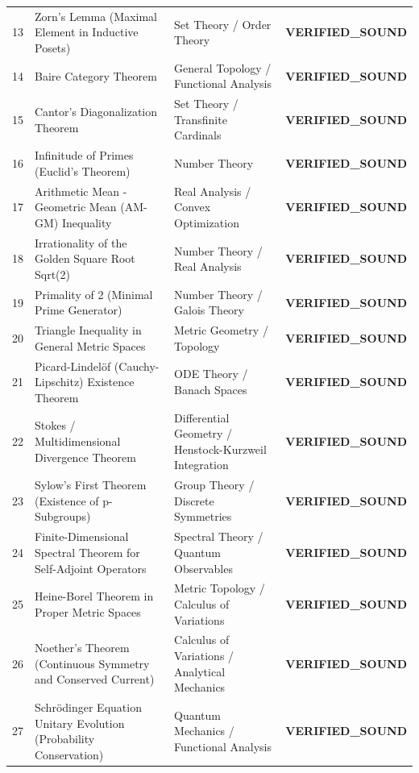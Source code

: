 \documentclass[10pt,a4paper]{article}
\begin{document}
\begin{longtable}{p{0.6cm} p{6.8cm} p{4.0cm} p{3.2cm}}
13 & Zorn's Lemma (Maximal Element in Inductive Posets) & Set Theory / Order Theory & \textcolor{green!70!black}{\textbf{VERIFIED\_SOUND}} \\
14 & Baire Category Theorem & General Topology / Functional Analysis & \textcolor{green!70!black}{\textbf{VERIFIED\_SOUND}} \\
15 & Cantor's Diagonalization Theorem & Set Theory / Transfinite Cardinals & \textcolor{green!70!black}{\textbf{VERIFIED\_SOUND}} \\
16 & Infinitude of Primes (Euclid's Theorem) & Number Theory & \textcolor{green!70!black}{\textbf{VERIFIED\_SOUND}} \\
17 & Arithmetic Mean - Geometric Mean (AM-GM) Inequality & Real Analysis / Convex Optimization & \textcolor{green!70!black}{\textbf{VERIFIED\_SOUND}} \\
18 & Irrationality of the Golden Square Root Sqrt(2) & Number Theory / Real Analysis & \textcolor{green!70!black}{\textbf{VERIFIED\_SOUND}} \\
19 & Primality of 2 (Minimal Prime Generator) & Number Theory / Galois Theory & \textcolor{green!70!black}{\textbf{VERIFIED\_SOUND}} \\
20 & Triangle Inequality in General Metric Spaces & Metric Geometry / Topology & \textcolor{green!70!black}{\textbf{VERIFIED\_SOUND}} \\
21 & Picard-Lindelöf (Cauchy-Lipschitz) Existence Theorem & ODE Theory / Banach Spaces & \textcolor{green!70!black}{\textbf{VERIFIED\_SOUND}} \\
22 & Stokes / Multidimensional Divergence Theorem & Differential Geometry / Henstock-Kurzweil Integration & \textcolor{green!70!black}{\textbf{VERIFIED\_SOUND}} \\
23 & Sylow's First Theorem (Existence of p-Subgroups) & Group Theory / Discrete Symmetries & \textcolor{green!70!black}{\textbf{VERIFIED\_SOUND}} \\
24 & Finite-Dimensional Spectral Theorem for Self-Adjoint Operators & Spectral Theory / Quantum Observables & \textcolor{green!70!black}{\textbf{VERIFIED\_SOUND}} \\
25 & Heine-Borel Theorem in Proper Metric Spaces & Metric Topology / Calculus of Variations & \textcolor{green!70!black}{\textbf{VERIFIED\_SOUND}} \\
26 & Noether's Theorem (Continuous Symmetry and Conserved Current) & Calculus of Variations / Analytical Mechanics & \textcolor{green!70!black}{\textbf{VERIFIED\_SOUND}} \\
27 & Schrödinger Equation Unitary Evolution (Probability Conservation) & Quantum Mechanics / Functional Analysis & \textcolor{green!70!black}{\textbf{VERIFIED\_SOUND}} \\

\end{longtable}
\end{document}
